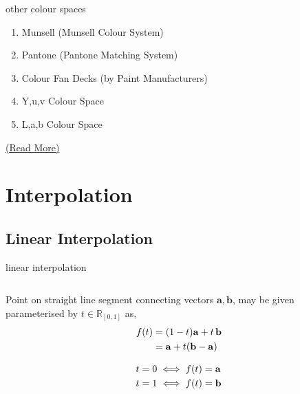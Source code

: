 \documentclass[aspectratio=169,xcolor={dvipsnames,svgnames}]{beamer}
\begin{document}
\begin{frame}[label={sec:org0f96d8a}]{other colour spaces}
\begin{enumerate}
\item Munsell (Munsell Colour System)
\item Pantone (Pantone Matching System)
\item Colour Fan Decks (by Paint Manufacturers)
\item Y,u,v Colour Space
\item L,a,b Colour Space
\end{enumerate}


\href{https://en.wikipedia.org/wiki/List\_of\_color\_spaces\_and\_their\_uses}{(Read More)}
\end{frame}

\section{Interpolation}
\label{sec:orgbfc2d4f}

\subsection{Linear Interpolation}
\label{sec:orgea2efd0}

\begin{frame}[label={sec:org27fb44d}]{linear interpolation}
\begin{columns}
\begin{column}{.5\columnwidth}
Point on straight line segment connecting vectors
\(\mathbf{a},\mathbf{b}\), may be given parameterised by
\(t\in\mathbb{R}_{[0,1]}\) as,
\begin{align}
  \notag
  f(t) &= (1-t)\mathbf{a} + t\,\mathbf{b} \\
  \notag
  &= \mathbf{a} + t(\mathbf{b}-\mathbf{a})
\end{align}

\begin{align}
  \notag
  t=0 &\iff f(t) = \mathbf{a} \\
  \notag
  t=1 &\iff f(t) = \mathbf{b}
\end{align}
\end{column}
\end{columns}
\end{frame}
\end{document}

